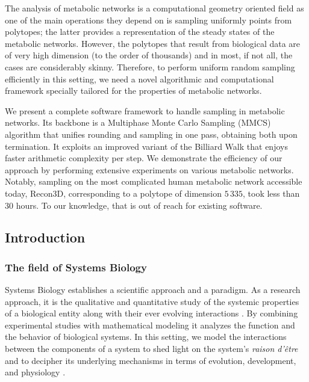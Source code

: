    The analysis of metabolic networks is a computational geometry oriented field
   as one of the main operations they depend on is sampling uniformly points from  polytopes;
   the latter provides a representation of the steady states of the metabolic networks.
   However, the polytopes that result from biological data are of very high dimension (to the order of thousands) and in most, if not all, the cases are considerably skinny.
   Therefore, to perform uniform random sampling efficiently in this setting, we need
   a novel algorithmic and computational framework specially tailored
   for the properties of metabolic networks.

   We present a complete software framework to handle sampling in metabolic networks.
   Its backbone is a Multiphase Monte Carlo Sampling (MMCS) algorithm
   that unifies rounding and sampling in one pass, obtaining both upon termination.
   It exploits an
   improved variant of the Billiard Walk that enjoys faster arithmetic complexity per step.
   We demonstrate the efficiency of our approach by performing extensive experiments
   on various metabolic networks.
   Notably, sampling on the most complicated human metabolic network accessible today, Recon3D,
   corresponding to a polytope of dimension  $5\,335$, took less than $30$ hours.
   To our knowledge, that is out of reach for existing software.





\subsection{Introduction}
\label{sec:mmcs-intro}

   \subsubsection*{The field of Systems Biology}

   Systems Biology establishes a scientific approach and a paradigm. As a
   research approach, it is the qualitative and quantitative study of the systemic
   properties of a biological entity along with their ever evolving interactions
   \cite{klipp2016systems, kohl2010systems}.
   By combining experimental studies  with mathematical
   modeling it analyzes the function and the behavior of biological systems.
   In this setting, we model the interactions between the  components of a system
   to shed light  on the system's \textit{raison d'être} and to decipher its underlying mechanisms
   in terms of evolution, development, and physiology \cite{ideker2001new}.

